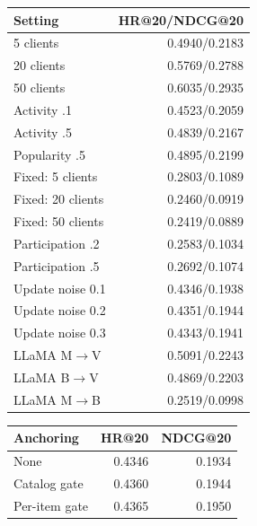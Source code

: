 \newpage

\par\noindent\begin{minipage}{\columnwidth}\centering\footnotesize
{}\label{tab:external-conditions}
\setlength{\tabcolsep}{2.5pt}
\begin{tabular*}{\linewidth}{@{\extracolsep{\fill}}lr@{}}
\toprule
Setting & HR@20/NDCG@20 \\
\midrule
5 clients & 0.4940/0.2183 \\
20 clients & 0.5769/0.2788 \\
50 clients & 0.6035/0.2935 \\
Activity .1 & 0.4523/0.2059 \\
Activity .5 & 0.4839/0.2167 \\
Popularity .5 & 0.4895/0.2199 \\
Fixed: 5 clients & 0.2803/0.1089 \\
Fixed: 20 clients & 0.2460/0.0919 \\
Fixed: 50 clients & 0.2419/0.0889 \\
Participation .2 & 0.2583/0.1034 \\
Participation .5 & 0.2692/0.1074 \\
Update noise 0.1 & 0.4346/0.1938 \\
Update noise 0.2 & 0.4351/0.1944 \\
Update noise 0.3 & 0.4343/0.1941 \\
LLaMA M$\to$V & 0.5091/0.2243 \\
LLaMA B$\to$V & 0.4869/0.2203 \\
LLaMA M$\to$B & 0.2519/0.0998 \\
\bottomrule
\end{tabular*}
\end{minipage}\par\addvspace{6pt}
\par\noindent\begin{minipage}{\columnwidth}\centering\footnotesize
{}\label{tab:anchor}
\setlength{\tabcolsep}{2.5pt}
\begin{tabular*}{\linewidth}{@{\extracolsep{\fill}}lrr@{}}
\toprule
Anchoring & HR@20 & NDCG@20 \\
\midrule
None & 0.4346 & 0.1934 \\
Catalog gate & 0.4360 & 0.1944 \\
Per-item gate & 0.4365 & 0.1950 \\
\bottomrule
\end{tabular*}
\end{minipage}\par\addvspace{6pt}
